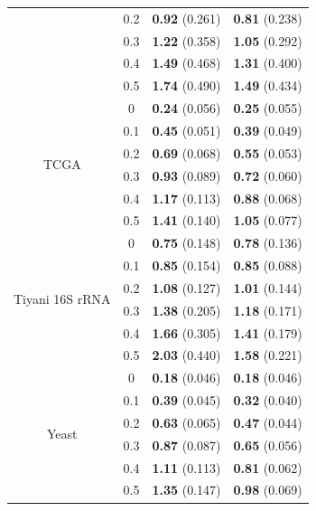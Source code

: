 \documentclass[11pt,a4paper]{article}
\begin{document}
\begin{table}[H]
\begin{tabular}{ccrr}
          & 0.2 & \textbf{0.92} (0.261) & \textbf{0.81} (0.238)\\
          & 0.3 & \textbf{1.22} (0.358) & \textbf{1.05} (0.292)\\
          & 0.4 & \textbf{1.49} (0.468) & \textbf{1.31} (0.400)\\
          & 0.5 & \textbf{1.74} (0.490) & \textbf{1.49} (0.434)\\
          \midrule
         \multirow{6}{*}{TCGA} & 0 & \textbf{0.24} (0.056) & \textbf{0.25} (0.055)\\
          & 0.1 & \textbf{0.45} (0.051) & \textbf{0.39} (0.049)\\
          & 0.2 & \textbf{0.69} (0.068) & \textbf{0.55} (0.053)\\
          & 0.3 & \textbf{0.93} (0.089) & \textbf{0.72} (0.060)\\
          & 0.4 & \textbf{1.17} (0.113) & \textbf{0.88} (0.068)\\
          & 0.5 & \textbf{1.41} (0.140) & \textbf{1.05} (0.077)\\
          \midrule
         \multirow{6}{*}{Tiyani 16S rRNA} & 0 & \textbf{0.75} (0.148) & \textbf{0.78} (0.136)\\
          & 0.1 & \textbf{0.85} (0.154) & \textbf{0.85} (0.088)\\
          & 0.2 & \textbf{1.08} (0.127) & \textbf{1.01} (0.144)\\
          & 0.3 & \textbf{1.38} (0.205) & \textbf{1.18} (0.171)\\
          & 0.4 & \textbf{1.66} (0.305) & \textbf{1.41} (0.179)\\
          & 0.5 & \textbf{2.03} (0.440) & \textbf{1.58} (0.221)\\
          \midrule
         \multirow{6}{*}{Yeast} & 0 & \textbf{0.18} (0.046) & \textbf{0.18} (0.046)\\
          & 0.1 & \textbf{0.39} (0.045) & \textbf{0.32} (0.040)\\
          & 0.2 & \textbf{0.63} (0.065) & \textbf{0.47} (0.044)\\
          & 0.3 & \textbf{0.87} (0.087) & \textbf{0.65} (0.056)\\
          & 0.4 & \textbf{1.11} (0.113) & \textbf{0.81} (0.062)\\
          & 0.5 & \textbf{1.35} (0.147) & \textbf{0.98} (0.069)\\
         \bottomrule
    \end{tabular}
    \label{tab:supTabDensity}
\end{table}
\newpage
\end{document}
